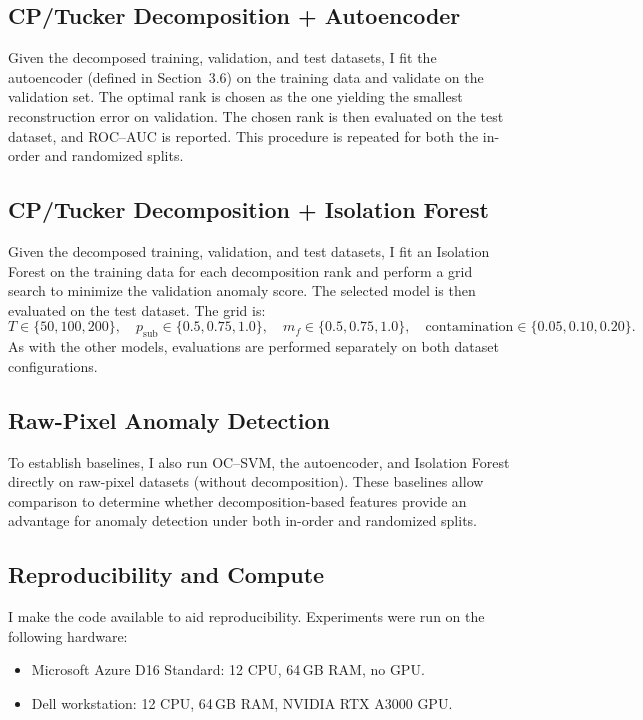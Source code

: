 \documentclass[11pt]{article}
\begin{document}
\subsection{CP/Tucker Decomposition + Autoencoder}
Given the decomposed training, validation, and test datasets, I fit the autoencoder (defined in Section~3.6) on the training data and validate on the validation set. The optimal rank is chosen as the one yielding the smallest reconstruction error on validation. The chosen rank is then evaluated on the test dataset, and ROC--AUC is reported. This procedure is repeated for both the in-order and randomized splits.

\subsection{CP/Tucker Decomposition + Isolation Forest}
Given the decomposed training, validation, and test datasets, I fit an Isolation Forest on the training data for each decomposition rank and perform a grid search to minimize the validation anomaly score. The selected model is then evaluated on the test dataset. The grid is:
\[
T \in \{50,100,200\},\quad
p_{\text{sub}} \in \{0.5,0.75,1.0\},\quad
m_f \in \{0.5,0.75,1.0\},\quad
\text{contamination} \in \{0.05,0.10,0.20\}.
\]
As with the other models, evaluations are performed separately on both dataset configurations.

\subsection{Raw-Pixel Anomaly Detection}
To establish baselines, I also run OC\mbox{--}SVM, the autoencoder, and Isolation Forest directly on raw-pixel datasets (without decomposition). These baselines allow comparison to determine whether decomposition-based features provide an advantage for anomaly detection under both in-order and randomized splits.

\subsection{Reproducibility and Compute}
I make the code available to aid reproducibility. Experiments were run on the following hardware:
\begin{itemize}
  \item Microsoft Azure D16 Standard: 12 CPU, 64\,GB RAM, no GPU.
  \item Dell workstation: 12 CPU, 64\,GB RAM, NVIDIA RTX A3000 GPU.
\end{itemize}
\end{document}
